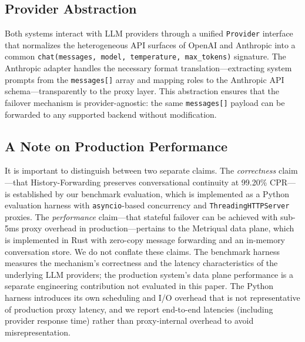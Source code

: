 \subsection{Provider Abstraction}

Both systems interact with LLM providers through a unified \texttt{Provider} interface that normalizes the heterogeneous API surfaces of OpenAI and Anthropic into a common \texttt{chat(messages, model, temperature, max\_tokens)} signature. The Anthropic adapter handles the necessary format translation---extracting system prompts from the \texttt{messages[]} array and mapping roles to the Anthropic API schema---transparently to the proxy layer. This abstraction ensures that the failover mechanism is provider-agnostic: the same \texttt{messages[]} payload can be forwarded to any supported backend without modification.

\subsection{A Note on Production Performance}

It is important to distinguish between two separate claims. The \textit{correctness} claim---that History-Forwarding preserves conversational continuity at 99.20\% CPR---is established by our benchmark evaluation, which is implemented as a Python evaluation harness with \texttt{asyncio}-based concurrency and \texttt{ThreadingHTTPServer} proxies. The \textit{performance} claim---that stateful failover can be achieved with sub-5ms proxy overhead in production---pertains to the Metriqual data plane, which is implemented in Rust with zero-copy message forwarding and an in-memory conversation store. We do not conflate these claims. The benchmark harness measures the mechanism's correctness and the latency characteristics of the underlying LLM providers; the production system's data plane performance is a separate engineering contribution not evaluated in this paper. The Python harness introduces its own scheduling and I/O overhead that is not representative of production proxy latency, and we report end-to-end latencies (including provider response time) rather than proxy-internal overhead to avoid misrepresentation.
